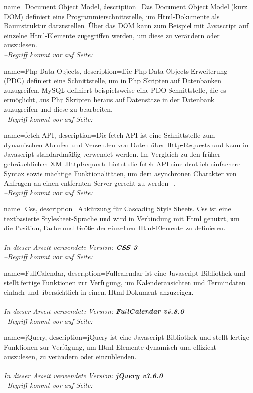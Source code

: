 {
    name=Document Object Model,
    description={Das Document Object Model (kurz DOM) definiert eine Programmierschnittstelle, um \gls{Html}-Dokumente als Baumstruktur darzustellen. Über das DOM kann zum Beispiel mit \gls{Javascript} auf einzelne Html-Elemente zugegriffen werden, um diese zu verändern oder auszulesen.}
    \\\textit{--Begriff kommt vor auf Seite: }
}

{
    name=Php Data Objects,
    description={Die Php-Data-Objects Erweiterung (PDO) definiert eine Schnittstelle, um in \gls{Php} Skripten auf Datenbanken zuzugreifen. \gls{MySQL} definiert beispielsweise eine PDO-Schnittstelle, die es ermöglicht, aus Php Skripten heraus auf Datensätze in der Datenbank zuzugreifen und diese zu bearbeiten.}
    \\\textit{--Begriff kommt vor auf Seite: }
}

{
    name=fetch API,
    description={Die fetch API ist eine Schnittstelle zum dynamischen Abrufen und Versenden von Daten über \gls{Http}-Requests und kann in \gls{Javascript} standardmäßig verwendet werden. Im Vergleich zu den früher gebräuchlichen XMLHttpRequests bietet die fetch API eine deutlich einfachere Syntax sowie mächtige Funktionalitäten, um dem asynchronen Charakter von Anfragen an einen entfernten Server gerecht zu werden
            ~\cite{fetchAPI}.}
    \\\textit{--Begriff kommt vor auf Seite: }
}

{
    name=Css,
    description={Abkürzung für Cascading Style Sheets. Css ist eine textbasierte Stylesheet-Sprache und wird in Verbindung mit \gls{Html} genutzt, um die Position, Farbe und Größe der einzelnen Html-Elemente zu definieren.\\ \\
            \textit{In dieser Arbeit verwendete Version: \textbf{CSS 3}}
            ~\cite{Css}}
    \\\textit{--Begriff kommt vor auf Seite: }
}

{
    name=FullCalendar,
    description={Fullcalendar ist eine \gls{Javascript}-Bibliothek und stellt fertige Funktionen zur Verfügung, um Kalenderansichten und Termindaten einfach und übersichtlich in einem \gls{Html}-Dokument anzuzeigen.\\ \\
            \textit{In dieser Arbeit verwendete Version: \textbf{FullCalendar v5.8.0}}
            ~\cite{fullCalendarWeb}}
    \\\textit{--Begriff kommt vor auf Seite: }
}

{
    name=jQuery,
    description={jQuery ist eine \gls{Javascript}-Bibliothek und stellt fertige Funktionen zur Verfügung, um \gls{Html}-Elemente dynamisch und effizient auszulesen, zu verändern oder einzublenden.\\ \\
            \textit{In dieser Arbeit verwendete Version: \textbf{jQuery v3.6.0}}
            ~\cite{jQuery}}
    \\\textit{--Begriff kommt vor auf Seite: }
}